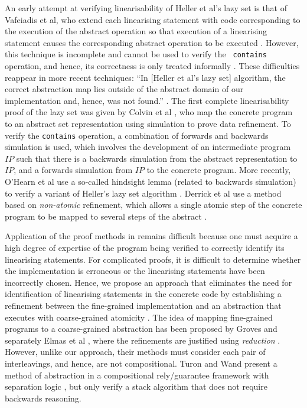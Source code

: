 \documentclass{article}
\theoremstyle{plain}
\newcounter{thm}
\theoremstyle{definition}
\begin{document}
An early attempt at verifying linearisability of Heller et al's lazy
set is that of Vafeiadis et al, who extend each linearising statement
with code corresponding to the execution of the abstract operation so
that execution of a linearising statement causes the corresponding
abstract operation to be executed \cite{VHHS06}. However, this
technique is incomplete and cannot be used to verify the {\tt
  contains} operation, and hence, its correctness is only treated
informally \cite{VHHS06}. These difficulties reappear in more recent
techniques: ``In [Heller et al's lazy set] algorithm, the correct
abstraction map lies outside of the abstract domain of our
implementation and, hence, was not found.''  \cite{Vaf10}.  The first
complete linearisability proof of the lazy set was given by Colvin et
al \cite{CGLM06}, who map the concrete program to an abstract set
representation using simulation to prove data refinement. To verify
the {\tt contains} operation, a combination of forwards and backwards
simulation is used, which
involves the development of an intermediate program $IP$ such that
there is a backwards simulation from the abstract representation to
$IP$, and a forwards simulation from $IP$ to the concrete
program. More recently, O'Hearn et al use a so-called hindsight lemma
(related to backwards simulation) to verify a variant of Heller's lazy
set algorithm \cite{OHea10}.  Derrick et al use a method based on
\emph{non-atomic} refinement, which allows a single atomic step of the
concrete program to be mapped to several steps of the abstract
\cite{DSW11}.

Application of the proof methods in \cite{VHHS06,CGLM06,OHea10,DSW11}
remains difficult because one must acquire a high degree of expertise
of the program being verified to correctly identify its linearising
statements. For complicated proofs, it is difficult to determine
whether the implementation is erroneous or the linearising statements
have been incorrectly chosen. Hence, we propose an approach that
eliminates the need for identification of linearising statements in
the concrete code by establishing a refinement between the
fine-grained implementation and an abstraction that executes with
coarse-grained atomicity \cite{DD12}. The idea of mapping fine-grained
programs to a coarse-grained abstraction has been proposed by Groves
\cite{Gro08} and separately Elmas et al \cite{EQSST10}, where the
refinements are justified using \emph{reduction}
\cite{Lip75}. However, unlike our approach, their methods must
consider each pair of interleavings, and hence, are not
compositional. Turon and Wand present a method of abstraction in a
compositional rely/guarantee framework with separation logic
\cite{TW11}, but only verify a stack algorithm that does not require
backwards reasoning.
\end{document}
